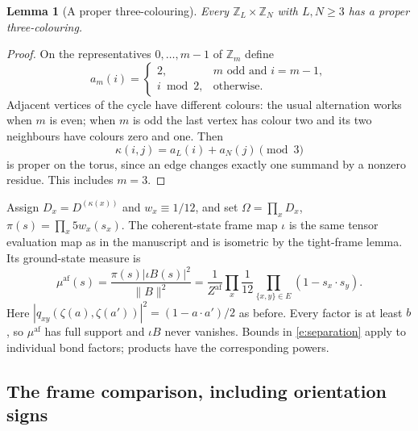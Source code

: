 \documentclass[11pt,reqno]{amsart}
\newtheorem{lemma}[theorem]{Lemma}
\theoremstyle{definition}
\newcommand{\Z}{\mathbb Z}
\newcommand{\af}{\mathrm{af}}
\begin{document}
\begin{lemma}[A proper three-colouring]\label{l:colour}
Every $\Z_L\times\Z_N$ with $L,N\ge3$ has a proper three-colouring.
\end{lemma}
\begin{proof}
On the representatives $0,\ldots,m-1$ of $\Z_m$ define
\[
 a_m(i)=\begin{cases}2,&m\text{ odd and }i=m-1,\\
                         i\bmod2,&\text{otherwise}.
          \end{cases}
\]
Adjacent vertices of the cycle have different colours: the usual
alternation works when $m$ is even; when $m$ is odd the last vertex has
colour two and its two neighbours have colours zero and one. Then
\[
 \kappa(i,j)=a_L(i)+a_N(j)\pmod3
\]
is proper on the torus, since an edge changes exactly one summand by a
nonzero residue. This includes $m=3$.
\end{proof}

Assign $D_x=D^{(\kappa(x))}$ and $w_x\equiv1/12$, and set
$\Omega=\prod_xD_x$, $\pi(s)=\prod_x5w_x(s_x)$.
The coherent-state frame map $\iota$ is the same tensor evaluation map
as in the manuscript and is isometric by the tight-frame lemma. Its
ground-state measure is
\begin{equation}\label{e:mucirc}
 \mu^{\af}(s)=\frac{\pi(s)|\iota B(s)|^2}{\|B\|^2}
 =\frac1{Z^{\af}}\prod_x\frac1{12}
       \prod_{\{x,y\}\in E}(1-s_x\cdot s_y).
\end{equation}
Here $|q_{xy}(\zeta(a),\zeta(a'))|^2=(1-a\cdot a')/2$ as before.
Every factor is at least $b$, so $\mu^{\af}$ has full support and
$\iota B$ never vanishes. Bounds in \eqref{e:separation} apply to
individual bond factors; products have the corresponding powers.

\subsection{The frame comparison, including orientation signs}
\end{document}
